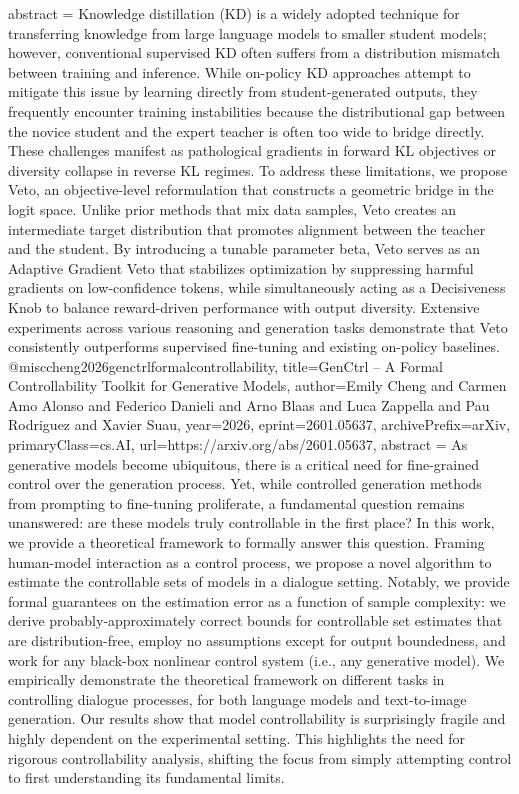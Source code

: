 {      abstract = {Knowledge distillation (KD) is a widely adopted technique for transferring knowledge from large language models to smaller student models; however, conventional supervised KD often suffers from a distribution mismatch between training and inference. While on-policy KD approaches attempt to mitigate this issue by learning directly from student-generated outputs, they frequently encounter training instabilities because the distributional gap between the novice student and the expert teacher is often too wide to bridge directly. These challenges manifest as pathological gradients in forward KL objectives or diversity collapse in reverse KL regimes. To address these limitations, we propose Veto, an objective-level reformulation that constructs a geometric bridge in the logit space. Unlike prior methods that mix data samples, Veto creates an intermediate target distribution that promotes alignment between the teacher and the student. By introducing a tunable parameter beta, Veto serves as an Adaptive Gradient Veto that stabilizes optimization by suppressing harmful gradients on low-confidence tokens, while simultaneously acting as a Decisiveness Knob to balance reward-driven performance with output diversity. Extensive experiments across various reasoning and generation tasks demonstrate that Veto consistently outperforms supervised fine-tuning and existing on-policy baselines.}
}@misc{cheng2026genctrlformalcontrollability,
      title={GenCtrl -- A Formal Controllability Toolkit for Generative Models}, 
      author={Emily Cheng and Carmen Amo Alonso and Federico Danieli and Arno Blaas and Luca Zappella and Pau Rodriguez and Xavier Suau},
      year={2026},
      eprint={2601.05637},
      archivePrefix={arXiv},
      primaryClass={cs.AI},
      url={https://arxiv.org/abs/2601.05637},
      abstract = {As generative models become ubiquitous, there is a critical need for fine-grained control over the generation process. Yet, while controlled generation methods from prompting to fine-tuning proliferate, a fundamental question remains unanswered: are these models truly controllable in the first place? In this work, we provide a theoretical framework to formally answer this question. Framing human-model interaction as a control process, we propose a novel algorithm to estimate the controllable sets of models in a dialogue setting. Notably, we provide formal guarantees on the estimation error as a function of sample complexity: we derive probably-approximately correct bounds for controllable set estimates that are distribution-free, employ no assumptions except for output boundedness, and work for any black-box nonlinear control system (i.e., any generative model). We empirically demonstrate the theoretical framework on different tasks in controlling dialogue processes, for both language models and text-to-image generation. Our results show that model controllability is surprisingly fragile and highly dependent on the experimental setting. This highlights the need for rigorous controllability analysis, shifting the focus from simply attempting control to first understanding its fundamental limits.}
}
